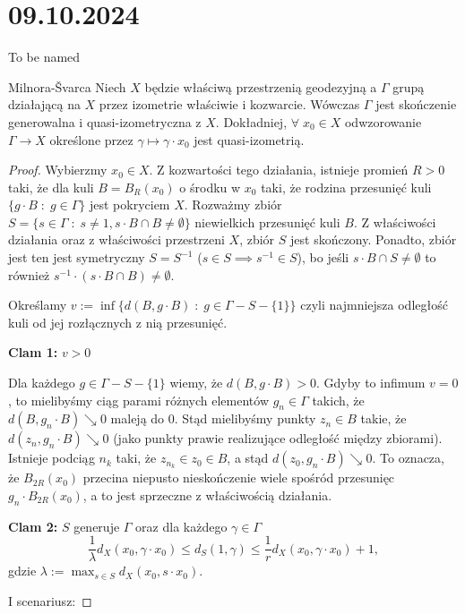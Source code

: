 \section{09.10.2024}{To be named}

\begin{lemma}{Milnora-\v{S}varca}{}
  Niech $X$ będzie właściwą przestrzenią geodezyjną a $\Gamma$ grupą działającą na $X$ przez izometrie właściwie i kozwarcie. Wówczas $\Gamma$ jest skończenie generowalna i quasi-izometryczna z $X$. Dokładniej, $\forall\;x_0\in X$ odwzorowanie $\Gamma\to X$ określone przez $\gamma\mapsto \gamma\cdot x_0$ jest quasi-izometrią.
\end{lemma}

\begin{proof}
  Wybierzmy $x_0\in X$. Z kozwartości tego działania, istnieje promień $R>0$ taki, że dla kuli $B=B_R(x_0)$ o środku w $x_0$ taki, że rodzina przesunięć kuli $\{g\cdot B\;:\; g\in\Gamma\}$ jest pokryciem $X$. Rozważmy zbiór $S=\{s\in\Gamma\;:\;s\neq1,s\cdot B\cap B\neq \emptyset\}$ niewielkich przesunięć kuli $B$. Z właściwości działania oraz z właściwości przestrzeni $X$, zbiór $S$ jest skończony. Ponadto, zbiór jest ten jest symetryczny $S=S^{-1}$ ($s\in S\implies s^{-1}\in S$), bo jeśli $s\cdot B\cap S\neq \emptyset$ to również $s^{-1}\cdot (s\cdot B\cap B)\neq \emptyset$.

  Określamy $v:=\inf\{d(B, g\cdot B)\;:\;g\in \Gamma-S-\{1\}\}$ czyli najmniejsza odległość kuli od jej rozłącznych z nią przesunięć.

  \textbf{Clam 1:} $v>0$

  Dla każdego $g\in\Gamma-S-\{1\}$ wiemy, że $d(B, g\cdot B)>0$. Gdyby to infimum $v=0$, to mielibyśmy ciąg parami różnych elementów $g_n\in\Gamma$ takich, że $d(B, g_n\cdot B)\searrow 0$ maleją do $0$. Stąd mielibyśmy punkty $z_n\in B$ takie, że $d(z_n, g_n\cdot B)\searrow 0$ (jako punkty prawie realizujące odległość między zbiorami). Istnieje podciąg $n_k$ taki, że $z_{n_k}\in z_0\in B$, a stąd $d(z_0, g_n\cdot B)\searrow 0$. To oznacza, że $B_{2R}(x_0)$ przecina niepusto nieskończenie wiele spośród przesunięc $g_n\cdot B_{2R}(x_0)$, a to jest sprzeczne z właściwością działania.

  \textbf{Clam 2:} $S$ generuje $\Gamma$ oraz dla każdego $\gamma\in\Gamma$
  $$\frac{1}{\lambda}d_X(x_0, \gamma\cdot x_0)\leq d_S(1, \gamma)\leq\frac{1}{r}d_X(x_0,\gamma\cdot x_0)+1,$$
  gdzie $\lambda:=\max_{s\in S}d_X(x_0, s\cdot x_0)$.

  I scenariusz:


\end{proof}
